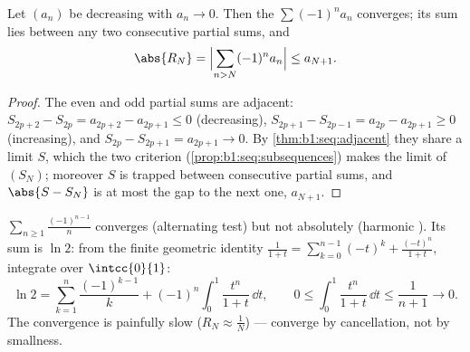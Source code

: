 \begin{theorem}\label{thm:b1:series:alternating}
Let $(a_n)$ be decreasing with $a_n \to 0$. Then the  $\sum (-1)^n a_n$ converges; its sum lies between any two
consecutive partial sums, and
\[
\abs{R_N} = \Bigl| \sum_{n > N} (-1)^n a_n \Bigr| \leq a_{N+1} .
\]
\end{theorem}

\begin{proof}
The even and odd partial sums are adjacent: $S_{2p+2} - S_{2p} =
a_{2p+2} - a_{2p+1} \leq 0$ (decreasing), $S_{2p+1} - S_{2p-1} =
a_{2p} - a_{2p+1} \geq 0$ (increasing), and $S_{2p} - S_{2p+1} =
a_{2p+1} \to 0$. By \cref{thm:b1:seq:adjacent} they share a limit
$S$, which the two  criterion
(\cref{prop:b1:seq:subsequences}) makes the limit of $(S_N)$;
moreover $S$ is trapped between consecutive partial sums, and
$\abs{S - S_N}$ is at most the gap to the next one, $a_{N+1}$.
\end{proof}

\begin{example}\label{ex:b1:series:ln2}
$\sum_{n \geq 1} \frac{(-1)^{n-1}}{n}$ converges (alternating test)
but not absolutely (harmonic ). Its sum is $\ln 2$: from the
finite geometric identity $\frac{1}{1+t} = \sum_{k=0}^{n-1} (-t)^k +
\frac{(-t)^n}{1+t}$, integrate over $\intcc{0}{1}$:
\[
\ln 2 = \sum_{k=1}^{n} \frac{(-1)^{k-1}}{k}
+ (-1)^n \int_0^1 \frac{t^n}{1+t}\,\dd t ,
\qquad
0 \leq \int_0^1 \frac{t^n}{1+t}\,\dd t \leq \frac{1}{n+1} \to 0 .
\]
The convergence is painfully slow ($R_N \approx \frac{1}{N}$) ---
 converge by cancellation, not by smallness.
\end{example}

